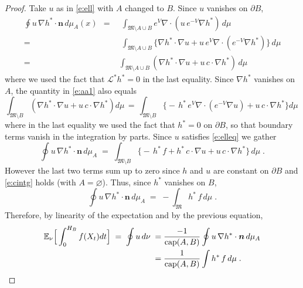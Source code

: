 \documentclass[reqno]{amsart}
\newcounter{as}[section]
\newcommand{\mc}[1]{{\mathcal #1}}
\newcommand{\mf}[1]{{\mathfrak #1}}
\newcommand{\bb}[1]{{\mathbb #1}}
\newcommand{\bs}[1]{{\boldsymbol #1}}
\newcommand{\<}{\langle}
\renewcommand{\>}{\rangle}
\renewcommand{\Cap}{{\rm cap}}
\begin{document}
\begin{proof}
Take $u$ as in \eqref{e:ell} with $A$ changed to $B$. Since $u$
vanishes on $\partial B$,
\begin{equation}
\label{e:aa1}
\begin{aligned}
\oint u\, \nabla h^* \cdot \bs n\, d\mu_A(x)\, \;=
& \;
\int_{\mf M\setminus A\cup B} e^{V} \nabla \cdot
\left(u\, e^{-V} \nabla h^* \right)\, d\mu
\\
= &\;
\int_{\mf M\setminus A\cup B} \big\{ \nabla h^* \cdot \nabla u
+ u \,e^{V} \nabla \cdot \left(e^{-V} \nabla h^* \right)\big\}
\, d\mu
\\
= & \int_{\mf M\setminus A\cup B} \left( \nabla h^* \cdot
  \nabla u
+ u \, c\cdot \nabla h^* \right)\, d\mu \,
\end{aligned}
\end{equation}
where we used the fact that $\mc L^* h^*=0$ in the last equality.
Since $\nabla h^*$ vanishes on $A$, the quantity in \eqref{e:aa1} also
equals
\begin{equation*}
\int_{\mf M\setminus B}
\left( \nabla h^* \cdot \nabla u + u \, c\cdot \nabla h^* \right)
d\mu \, = \, \int_{\mf M\setminus B}  \big\{ -\, h^*\, e^V
\nabla \cdot \left(e^{-V}  \nabla u\right) + u \, c\cdot \nabla h^* \big\}
d\mu \,
\end{equation*}
where in the last equality we used the fact that $h^*=0$ on $\partial
B$, so that boundary terms vanish in the integration by parts.  Since
$u$ satisfies \eqref{e:elleq} we gather
\begin{equation*}
\oint u\, \nabla h^* \cdot \bs n\, d\mu_A
\;=\; \int_{\mf M\setminus B}
\big\{ -\, h^* \, f+h^*\, c \cdot\nabla u + u \, c\cdot \nabla h^* \big\}
\, d\mu \;.
\end{equation*}
However the last two terms sum up to zero since $h$ and $u$ are
constant on $\partial B$ and \eqref{e:cintg} holds (with
$A=\varnothing$). Thus, since $h^* $ vanishes on $B$,
\begin{equation*}
\oint u\, \nabla h^* \cdot \bs n\, d\mu_A
\;=\; - \int_{\mf M} h^* \, f\, d\mu \;.
\end{equation*}
Therefore, by linearity of the expectation and by the previous equation,
\begin{equation*}
\begin{aligned}
\bb E_{\nu} \Big[ \int_0^{H_B}f(X_t)dt\Big]
\;=\; \oint u \, d\nu\;= &\;
\frac{-1}{\Cap(A,B)} \oint u\, \nabla h^* \cdot \bs n\, d\mu_A
\\
=&\; \frac{1}{\Cap(A,B)}\int h^*\,f\,d\mu\;.
\end{aligned}
\end{equation*}
\end{proof}
\end{document}
